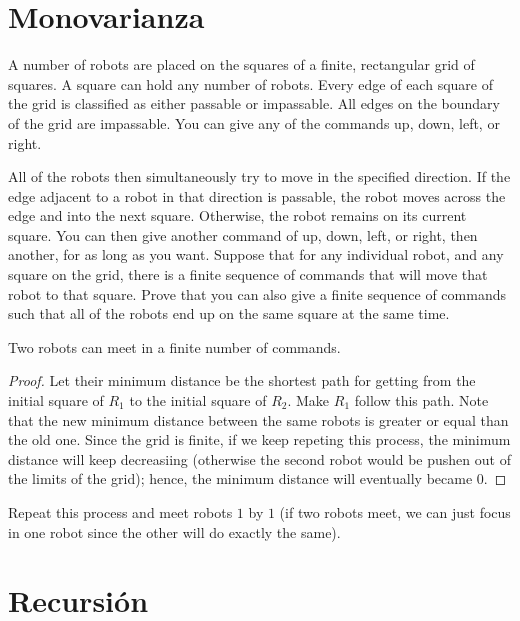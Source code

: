 \section{Monovarianza}

\begin{problem}
  A number of robots are placed on the squares of a finite, rectangular
  grid of squares. A square can hold any number of robots. Every edge of
  each square of the grid is classified as either passable or impassable.
  All edges on the boundary of the grid are impassable. You can give any
  of the commands up, down, left, or right.

  All of the robots then simultaneously try to move in the specified
  direction. If the edge adjacent to a robot in that direction is
  passable, the robot moves across the edge and into the next square.
  Otherwise, the robot remains on its current square. You can then give
  another command of up, down, left, or right, then another, for as long
  as you want. Suppose that for any individual robot, and any square on
  the grid, there is a finite sequence of commands that will move that
  robot to that square. Prove that you can also give a finite sequence of
  commands such that all of the robots end up on the same square at the
  same time.
\end{problem}

\begin{claim}
  Two robots can meet in a finite number of commands.
\end{claim}

\begin{proof}
  Let their minimum distance be the shortest path for 
  getting from the initial square of $R_1$ to the initial 
  square of $R_2$. Make $R_1$ follow this path. Note that 
  the new minimum distance between the same robots is greater 
  or equal than the old one. Since the grid is finite, if we  
  keep repeting this process, the minimum distance 
  will keep decreasiing (otherwise the second robot 
  would be pushen out of the limits of the grid); hence, 
  the minimum distance will eventually became $0$.
\end{proof}

Repeat this process and meet robots $1$ by $1$ (if two robots 
meet, we can just focus in one robot since the other will 
do exactly the same).

\section{Recursión}

